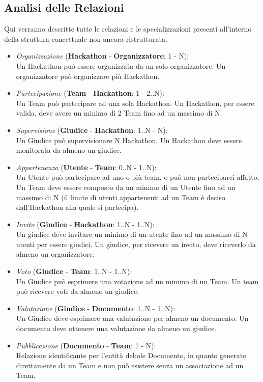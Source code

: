 \documentclass[a4paper, 10pt]{article}
\begin{document}
	\subsection{Analisi delle Relazioni}
	Qui verranno descritte tutte le relazioni e le specializzazioni presenti all'interno della struttura concettuale non ancora ristrutturata.
	\begin{itemize}
		\item \textit{Organizzazione} (\textbf{Hackathon} - \textbf{Organizzatore}: 1 - N):\\Un Hackathon può essere organizzata da un solo organizzatore. Un organizzatore può organizzare più Hackathon.
		\item \textit{Partecipazione} (\textbf{Team} - \textbf{Hackathon}: 1 - 2..N):\\Un Team può partecipare ad una sola Hackathon. Un Hackathon, per essere valida, deve avere un minimo di 2 Team fino ad un massimo di N.
		\item \textit{Supervisione} (\textbf{Giudice} - \textbf{Hackathon}: 1..N - N):\\Un Giudice può supervisionare N Hackathon. Un Hackathon deve essere monitorata da almeno un giudice.
		\item \textit{Appartenenza} (\textbf{Utente} - \textbf{Team}: 0..N - 1..N):\\Un Utente può partecipare ad uno o più team, o può non parteciparci affatto. Un Team deve essere composto da un minimo di un Utente fino ad un massimo di N (il limite di utenti appartenenti ad un Team è deciso dall'Hackathon alla quale si partecipa).
		\item \textit{Invito} (\textbf{Giudice} - \textbf{Hackathon}: 1..N - 1..N):\\Un giudice deve invitare un minimo di un utente fino ad un massimo di N utenti per essere giudici. Un giudice, per ricevere un invito, deve riceverlo da almeno un organizzatore.
		\item \textit{Voto} (\textbf{Giudice} - \textbf{Team}: 1..N - 1..N):\\Un Giudice può esprimere una votazione ad un minimo di un Team. Un team può ricevere voti da almeno un giudice.
		\item \textit{Valutazione} (\textbf{Giudice} - \textbf{Documento}: 1..N - 1..N):\\Un Giudice deve esprimere una valutazione per almeno un documento. Un documento deve ottenere una valutazione da almeno un giudice.
		\item \textit{Pubblicazione} (\textbf{Documento} - \textbf{Team}: 1 - N):\\Relazione identificante per l'entità debole Documento, in quanto generato direttamente da un Team e non può esistere senza un associazione ad un Team.
	\end{itemize}
\end{document}
